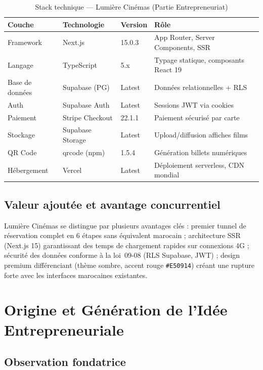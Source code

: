 \documentclass[12pt,a4paper,openany]{report}
\begin{document}
\begin{table}[H]
\centering
\small
\begin{tabular}{lllp{4.5cm}}
\toprule
\textbf{Couche} & \textbf{Technologie} & \textbf{Version} & \textbf{Rôle} \\
\midrule
Framework      & Next.js        & 15.0.3  & App Router, Server Components, SSR \\
Langage        & TypeScript     & 5.x     & Typage statique, composants React 19 \\
Base de données& Supabase (PG)  & Latest  & Données relationnelles + RLS \\
Auth           & Supabase Auth  & Latest  & Sessions JWT via cookies \\
Paiement       & Stripe Checkout& 22.1.1  & Paiement sécurisé par carte \\
Stockage       & Supabase Storage& Latest & Upload/diffusion affiches films \\
QR Code        & qrcode (npm)   & 1.5.4   & Génération billets numériques \\
Hébergement    & Vercel         & Latest  & Déploiement serverless, CDN mondial \\
\bottomrule
\end{tabular}
\caption{Stack technique — Lumière Cinémas (Partie Entrepreneuriat)}
\end{table}

\subsection{Valeur ajoutée et avantage concurrentiel}

Lumière Cinémas se distingue par plusieurs avantages clés : premier tunnel de réservation complet en 6 étapes sans équivalent marocain ; architecture SSR (Next.js 15) garantissant des temps de chargement rapides sur connexions 4G ; sécurité des données conforme à la loi~09-08 (RLS Supabase, JWT) ; design premium différenciant (thème sombre, accent rouge \texttt{\#E50914}) créant une rupture forte avec les interfaces marocaines existantes.

\section{Origine et Génération de l'Idée Entrepreneuriale}

\subsection{Observation fondatrice}
\end{document}

